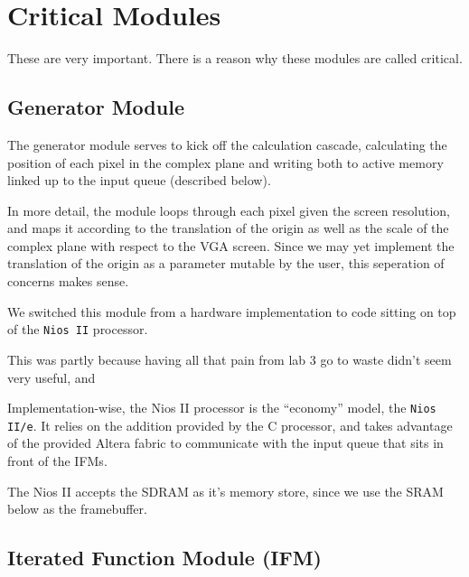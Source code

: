 \documentclass{article}
\begin{document}



\section{Critical Modules}

These are very important. There is a reason why these modules are
called critical.

\subsection{Generator Module}

The generator module serves to kick off the calculation cascade,
calculating the position of each pixel in the complex plane and
writing both to active memory linked up to the input queue (described
below).

In more detail, the module loops through each pixel given the screen
resolution, and maps it according to the translation of the origin as
well as the scale of the complex plane with respect to the VGA
screen. Since we may yet implement the translation of the origin as a
parameter mutable by the user, this seperation of concerns makes
sense.

We switched this module from a hardware implementation to code sitting
on top of the \verb!Nios II! processor.

This was partly because having all that pain from lab 3 go to waste
didn't seem very useful, and 

Implementation-wise, the Nios II processor is the ``economy'' model,
the \verb!Nios II/e!. It relies on the addition provided by the C
processor, and takes advantage of the provided Altera fabric to
communicate with the input queue that sits in front of the IFMs.

The Nios II accepts the SDRAM as it's memory store, since we use the
SRAM below as the framebuffer.

\subsection{Iterated Function Module (IFM)}
\end{document}
